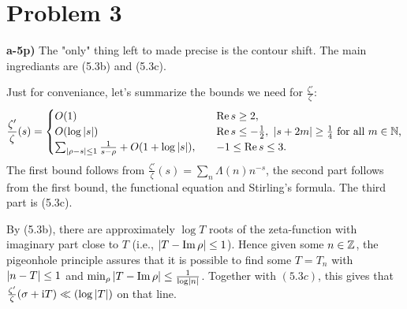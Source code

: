 \documentclass[a4paper,11pt]{article}
\begin{document}
\section*{Problem 3}
\textbf{a-5p)}
    The "only" thing left to made precise is the contour shift. The main ingrediants
    are (5.3b) and (5.3c).

    Just for conveniance, let's summarize the bounds we need for
    $\tfrac{\zeta'}\zeta$:
    \[
        \frac{\zeta'}{\zeta}(s) = 
        \begin{cases}
            O(1) \quad &\operatorname{Re} s \geq 2, \\
            O(\log \left\lvert s \right\rvert) \quad &\operatorname{Re} s \leq -\frac 12, \ \left\lvert s+2m \right\rvert \geq \frac 14 \text{ for all $m \in \mathbb{N}$,} \\
            \sum_{\left\lvert \rho - s \right\rvert \leq 1} \frac{1}{s-\rho} + O(1 + \log \left\lvert s \right\rvert),
            \quad & -1 \leq \operatorname{Re} s \leq 3. 
        \end{cases}
    \]
    The first bound follows from $\frac{\zeta'}\zeta(s) = \sum_n \Lambda(n) n^{-s}$,
    the second part follows from the first bound, the functional equation and
    Stirling's formula. The third part is (5.3c).

    By (5.3b), there are approximately $\log T$ roots of the zeta-function
    with imaginary part close to $T$ (i.e., $\left\lvert T- \operatorname{Im} \rho \right\rvert \leq 1$).
    Hence given some $n \in \mathbb{Z}$, the pigeonhole principle assures that it is 
    possible to find some $T = T_n$ with $\left\lvert n-T \right\rvert \leq 1$ and 
    $\min_{\rho}{\left\lvert T - \operatorname{Im}\rho \right\rvert} \leq \frac 1{\log \left\lvert n \right\rvert}$. Together
    with $(5.3c)$, this gives that $\frac{\zeta'}{\zeta}(\sigma + \mathrm i
    T) \ll (\log \left\lvert T \right\rvert)$ on that line. 
\end{document}
